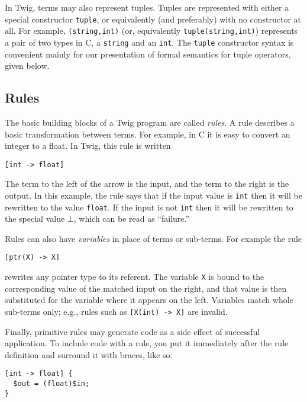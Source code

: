 In Twig, terms may also represent tuples. Tuples are represented with either a
special constructor \texttt{tuple}, or equivalently (and preferably) with no
constructor at all. For example, \texttt{(string,int)} (or, equivalently
\texttt{tuple(string,int)}) represents a pair of two types in C, a
\texttt{string} and an \texttt{int}. The \texttt{tuple} constructor syntax is
convenient mainly for our presentation of formal semantics for tuple
operators, given below.

\subsection{Rules}

The basic building blocks of a Twig program are called \emph{rules}. A rule
describes a basic transformation between terms. For example, in C it is easy
to convert an integer to a float. In Twig, this rule is written

\begin{verbatim}
[int -> float]
\end{verbatim}

The term to the left of the arrow is the input, and the term to the right is
the output. In this example, the rule says that if the input value is
\texttt{int} then it will be rewritten to the value \texttt{float}. If the
input is not \texttt{int} then it will be rewritten to the special value
$\bot$, which can be read as ``failure.''

Rules can also have \emph{variables} in place of terms or sub-terms. For
example the rule

\begin{verbatim}
[ptr(X) -> X]
\end{verbatim}

rewrites any pointer type to its referent. The variable \texttt{X} is bound to
the corresponding value of the matched input on the right, and that value is
then substituted for the variable where it appears on the left. Variables
match whole sub-terms only; e.g., rules such as \texttt{[X(int) -> X]} are
invalid.

Finally, primitive rules may generate code as a side effect of successful
application. To include code with a rule, you put it immediately after the
rule definition and surround it with braces, like so:

\begin{verbatim}
[int -> float] {
  $out = (float)$in;
}
\end{verbatim}

